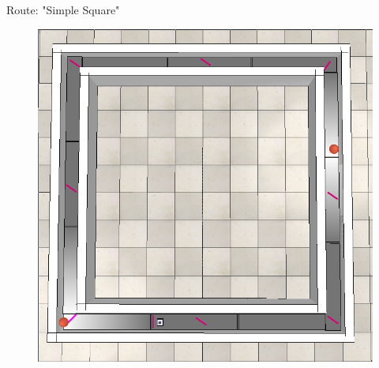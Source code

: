 \documentclass[10pt]{beamer}
\begin{document}
\begin{frame}{Route: "Simple Square"}
    \begin{figure}
        \centering
        \includegraphics[width=0.8\linewidth]{routes/simple_square.png}
    \end{figure}
\end{frame}
\end{document}
